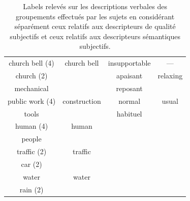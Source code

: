 \begin{table}[t]
\begin{tabular}{cc|cc}
\cline{1-2}
church bell (4)       & church bell             &  insupportable         & --- \\  \cline{3-4}
church (2)            &                         &  apaisant              & relaxing    \\ 
\cline{1-2}
mechanical            &                         &  reposant              &  \\ \cline{3-4}
public work  (4)      & construction            &  normal                & usual     \\ 
tools                 &                         &  habituel              & \\  	
\cline{1-2}			                                                             
human (4)             & human                   &                        &  \\  
people                &                         &                        & \\       
\cline{1-2}
traffic (2)           & traffic                 &                        & \\
car (2)               &                         &                        &  \\                   
\cline{1-2}
water                 & water                   &                        & \\ 
rain (2)              &                         &                        & \\
\end{tabular}
\vspace{0.5mm}
\caption{Labels relevés sur les descriptions verbales des groupements effectués par les sujets en considérant séparément ceux relatifs aux descripteurs de qualité subjectifs et ceux relatifs aux descripteurs sémantiques subjectifs.}
\label{tab:association}
\end{table}

